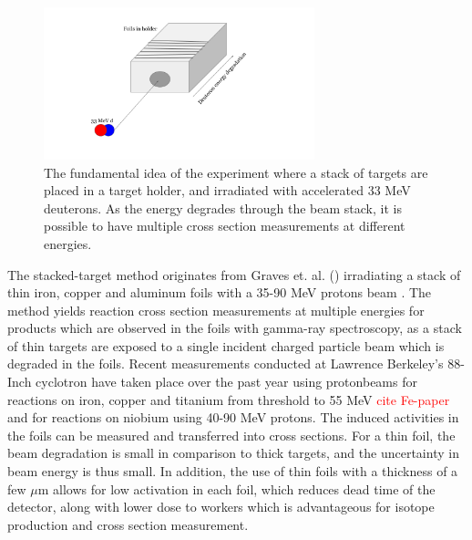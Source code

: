 \begin{figure}
    \centering
    \includegraphics[width=0.7\textwidth]{Experiment/Illustration_beamOnTarget.png}
    \caption{The fundamental idea of the experiment where a stack of targets are placed in a target holder, and irradiated with accelerated 33 MeV deuterons. As the energy degrades through the beam stack, it is possible to have multiple cross section measurements at different energies.}
    \label{fig:experiment_illustration}
\end{figure}

\noindent 
The stacked-target method originates from Graves et. al. () irradiating a stack of thin iron, copper and aluminum foils with a 35-90 MeV protons beam \cite{Graves2016}. The method yields reaction cross section measurements at multiple energies for products which are observed in the foils with gamma-ray spectroscopy, as a stack of thin targets are exposed to a single incident charged particle beam which is degraded in the foils. Recent measurements conducted at Lawrence Berkeley's 88-Inch cyclotron have taken place over the past year using protonbeams for reactions on iron, copper and titanium from threshold to 55 MeV  \textcolor{red}{cite Fe-paper}%
and for reactions on niobium using 40-90 MeV protons\cite{Voyles2018c}. The induced activities in the foils can be measured and transferred into cross sections. For a thin foil, the beam degradation is small in comparison to thick targets, and the uncertainty in beam energy is thus small. In addition, the use of thin foils with a thickness of a few $\mu$m allows for low activation in each foil, which reduces dead time of the detector, along with lower dose to workers which is advantageous for isotope production and cross section measurement\cite{Qaim2017c}. \\

